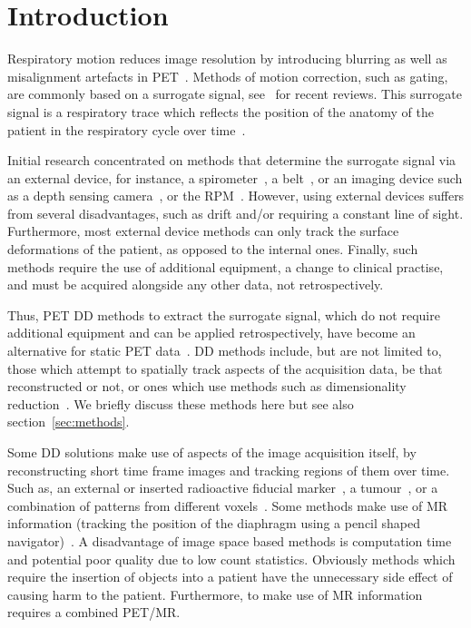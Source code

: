\section{Introduction} \label{sec:introduction}
    Respiratory motion reduces image resolution by introducing blurring as well as misalignment artefacts in \gls{PET}~\parencite{Nehmeh2008a}. Methods of motion correction, such as gating, are commonly based on a surrogate signal, see~\parencite{Lamare2022PETVadis, Kyme2021MotionCT} for recent reviews. This surrogate signal is a respiratory trace which reflects the position of the anatomy of the patient in the respiratory cycle over time~\parencite{Kesner2010AMethods, Kesner2013GatingPET}.
    
    Initial research concentrated on methods that determine the surrogate signal via an external device, for instance, a spirometer~\parencite{Voscopoulos2013EvaluationScenarios}, a belt~\parencite{Yu2016}, or an imaging device such as a depth sensing camera~\parencite{Silverstein2018ComparativeSensor, Xia2012AConcept}, or the \gls{RPM}~\parencite{Bettinardi2013Motion-trackingPET/CT}. However, using external devices suffers from several disadvantages, such as  drift and/or requiring a constant line of sight. Furthermore, most external device methods can only track the surface deformations of the patient, as opposed to the internal ones. Finally, such methods require the use of additional equipment, a change to clinical practise, and must be acquired alongside any other data, not retrospectively.
    
    Thus, \gls{PET} \gls{DD} methods to extract the surrogate signal, which do not require additional equipment and can be applied retrospectively, have become an alternative for static \gls{PET} data~\parencite{Kesner2014OnFramework}. \gls{DD} methods include, but are not limited to, those which attempt to spatially track aspects of the acquisition data, be that reconstructed or not, or ones which use methods such as dimensionality reduction~\parencite{Lamare2022PETVadis}. We briefly discuss these methods here but see also section~\ref{sec:methods}.
    
    Some \gls{DD} solutions make use of aspects of the image acquisition itself, by reconstructing short time frame images and tracking regions of them over time. Such as, an external or inserted radioactive fiducial marker~\parencite{Buther2013ExternalTomography., Zimmermann2003UseMRI}, a tumour~\parencite{Bundschuh2007}, or a combination of patterns from different voxels~\parencite{Kesner2009RespiratoryData}. Some methods make use of \gls{MR} information (tracking the position of the diaphragm using a pencil shaped navigator)~\parencite{Taylor1997MRAngiography, Furst2015MotionPET/MR}. A disadvantage of image space based methods is computation time and potential poor quality due to low count statistics. Obviously methods which require the insertion of objects into a patient have the unnecessary side effect of causing harm to the patient. Furthermore, to make use of \gls{MR} information requires a combined \gls{PET}/\gls{MR}.
    
